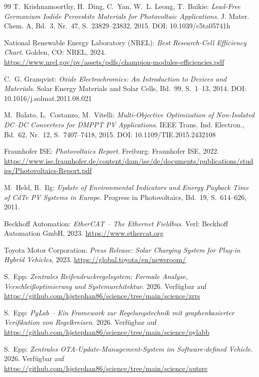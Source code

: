 ﻿\documentclass[a4paper,12pt]{article}
\theoremstyle{definition}
\theoremstyle{remark}
\begin{document}
\begin{thebibliography}{99}
T.~Krishnamoorthy, H.~Ding, C.~Yan, W.~L. Leong, T.~Baikie:
\textit{Lead-Free Germanium Iodide Perovskite Materials for Photovoltaic
Applications}.
J. Mater. Chem. A, Bd.~3, Nr.~47, S.~23829--23832, 2015.
DOI: 10.1039/c5ta05741h

National Renewable Energy Laboratory (NREL):
\textit{Best Research-Cell Efficiency Chart}.
Golden, CO: NREL, 2024.
\url{https://www.nrel.gov/pv/assets/pdfs/champion-modules-efficiencies.pdf}

C.~G. Granqvist:
\textit{Oxide Electrochromics: An Introduction to Devices and Materials}.
Solar Energy Materials and Solar Cells, Bd.~99, S.~1--13, 2014.
DOI: 10.1016/j.solmat.2011.08.021

M.~Balato, L.~Costanzo, M.~Vitelli:
\textit{Multi-Objective Optimization of Non-Isolated DC--DC Converters
for DMPPT PV Applications}.
IEEE Trans. Ind. Electron., Bd.~62, Nr.~12, S.~7407--7418, 2015.
DOI: 10.1109/TIE.2015.2432108

Fraunhofer ISE:
\textit{Photovoltaics Report}.
Freiburg: Fraunhofer ISE, 2022.
\url{https://www.ise.fraunhofer.de/content/dam/ise/de/documents/publications/studies/Photovoltaics-Report.pdf}

M.~Held, R.~Ilg:
\textit{Update of Environmental Indicators and Energy Payback Time
of CdTe PV Systems in Europe}.
Progress in Photovoltaics, Bd.~19, S.~614--626, 2011.

Beckhoff Automation:
\textit{EtherCAT -- The Ethernet Fieldbus}.
Verl: Beckhoff Automation GmbH, 2023.
\url{https://www.ethercat.org}

Toyota Motor Corporation:
\textit{Press Release: Solar Charging System for Plug-in Hybrid Vehicles},
2023. \url{https://global.toyota/en/newsroom/}

S.~Epp:
\textit{Zentrales Reifendruckregelsystem: Formale Analyse, Verschleißoptimierung und Systemarchitektur}. 2026. Verfügbar auf \url{https://github.com/hjstephan86/science/tree/main/science/zrrs}

S.~Epp:
\textit{PyLab -- Ein Framework zur Regelungstechnik mit graphenbasierter Verifikation von Regelkreisen}. 2026. Verfügbar auf \url{https://github.com/hjstephan86/science/tree/main/science/pylabb}

S.~Epp:
\textit{Zentrales OTA-Update-Management-System im Software-defined Vehicle}. 2026. Verfügbar auf \url{https://github.com/hjstephan86/science/tree/main/science/autsre}



\end{thebibliography}
\end{document}
